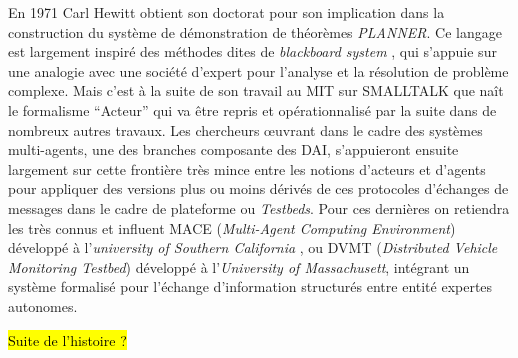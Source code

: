 
En 1971 Carl Hewitt obtient son doctorat pour son implication dans la construction du système de démonstration de théorèmes \textit{PLANNER}. Ce langage est largement inspiré des méthodes dites de \textit{blackboard system} , qui s'appuie sur une analogie avec une société d'expert pour l'analyse et la résolution de problème complexe. Mais c'est à la suite de son travail au MIT sur SMALLTALK  que naît le formalisme \enquote{Acteur}  qui va être repris et opérationnalisé par la suite dans de nombreux autres travaux. Les chercheurs œuvrant dans le cadre des systèmes multi-agents, une des branches composante des DAI, s’appuieront ensuite largement sur cette frontière très mince entre les notions d'acteurs et d'agents pour appliquer des versions plus ou moins dérivés de ces protocoles d'échanges de messages dans le cadre de plateforme ou \textit{Testbeds}. Pour ces dernières on retiendra les très connus et influent MACE (\textit{Multi-Agent Computing Environment}) développé à l'\textit{university of Southern California} , ou DVMT (\textit{Distributed Vehicle Monitoring Testbed}) développé à l'\textit{University of Massachusett}, intégrant un système formalisé pour l'échange d'information structurés entre entité expertes autonomes.

\hl{Suite de l'histoire ? }

